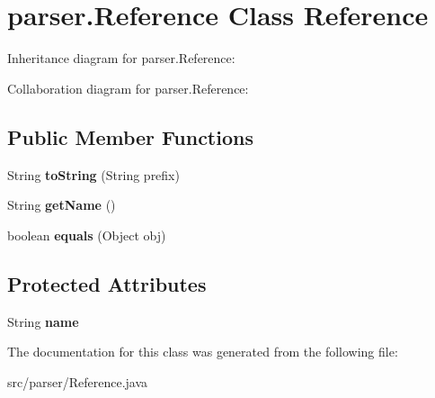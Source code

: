 \hypertarget{classparser_1_1_reference}{}\section{parser.\+Reference Class Reference}
\label{classparser_1_1_reference}


Inheritance diagram for parser.\+Reference\+:


Collaboration diagram for parser.\+Reference\+:
\subsection*{Public Member Functions}
\begin{DoxyCompactItemize}
\item 
String {\bfseries to\+String} (String prefix)\hypertarget{classparser_1_1_reference_a5808e0a9135dea57073e8c57cb2c2e73}{}\label{classparser_1_1_reference_a5808e0a9135dea57073e8c57cb2c2e73}

\item 
String {\bfseries get\+Name} ()\hypertarget{classparser_1_1_reference_a3879108785dc20edd6402a6611498a8e}{}\label{classparser_1_1_reference_a3879108785dc20edd6402a6611498a8e}

\item 
boolean {\bfseries equals} (Object obj)\hypertarget{classparser_1_1_reference_a63bab78114375bed571ba086d08355f4}{}\label{classparser_1_1_reference_a63bab78114375bed571ba086d08355f4}

\end{DoxyCompactItemize}
\subsection*{Protected Attributes}
\begin{DoxyCompactItemize}
\item 
String {\bfseries name}\hypertarget{classparser_1_1_reference_ad81b8426790ca2073dbb8b53433e76ed}{}\label{classparser_1_1_reference_ad81b8426790ca2073dbb8b53433e76ed}

\end{DoxyCompactItemize}


The documentation for this class was generated from the following file\+:\begin{DoxyCompactItemize}
\item 
src/parser/Reference.\+java\end{DoxyCompactItemize}
